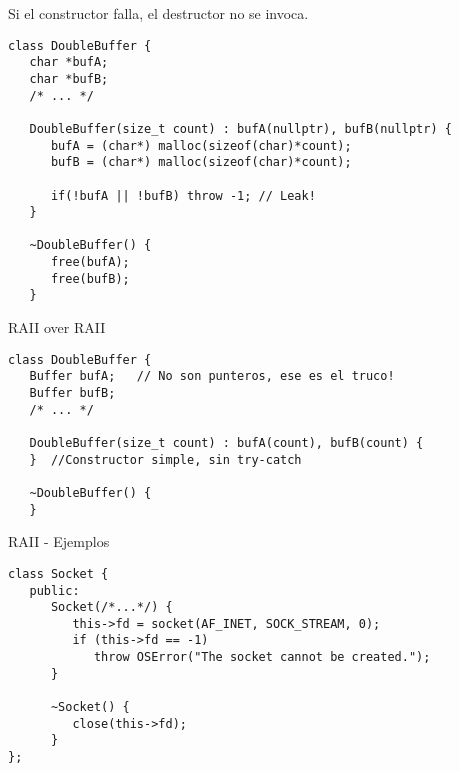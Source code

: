 \begin{frame}[fragile]{Si el constructor falla, el destructor no se invoca.}
   \begin{lstlisting}[style=normal]
class DoubleBuffer {
   char *bufA;
   char *bufB;
   /* ... */

   DoubleBuffer(size_t count) : bufA(nullptr), bufB(nullptr) {
      bufA = (char*) malloc(sizeof(char)*count);
      bufB = (char*) malloc(sizeof(char)*count);
      
      if(!bufA || !bufB) throw -1; // Leak!
   }

   ~DoubleBuffer() {
      free(bufA);
      free(bufB);
   }
   \end{lstlisting}
\end{frame}

\begin{frame}[fragile]{RAII over RAII}{}
   \begin{lstlisting}[style=normal]
class DoubleBuffer {
   Buffer bufA;   // No son punteros, ese es el truco!
   Buffer bufB;
   /* ... */

   DoubleBuffer(size_t count) : bufA(count), bufB(count) {
   }  //Constructor simple, sin try-catch

   ~DoubleBuffer() {
   }
   \end{lstlisting}
\end{frame}

\begin{frame}[fragile]{RAII - Ejemplos}
   \begin{lstlisting}[style=normal]
class Socket {
   public:
      Socket(/*...*/) {
         this->fd = socket(AF_INET, SOCK_STREAM, 0);
         if (this->fd == -1) 
            throw OSError("The socket cannot be created.");
      }

      ~Socket() {
         close(this->fd);
      }
};
   \end{lstlisting}
\end{frame}

